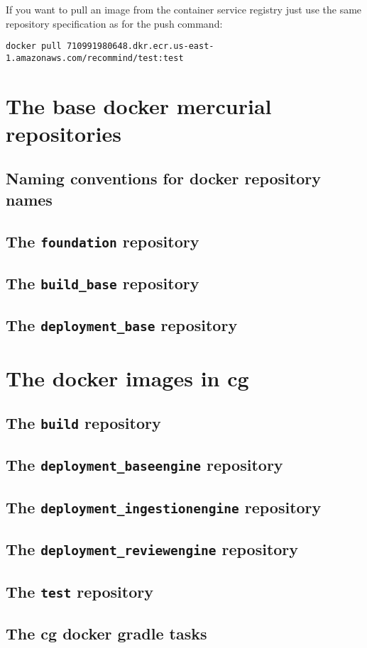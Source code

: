                    If you want to pull an image from the \aws{} container service registry just use the same repository specification as for the push command:
                   \begin{center}
                   		\texttt{docker pull 710991980648.dkr.ecr.us-east-1.amazonaws.com/recommind/test:test}
                 	\end{center}
	\section{The base docker mercurial repositories}\label{p01:ch05:docker_base_repos}
		\subsection{Naming conventions for docker repository names}
		\subsection{The \texttt{foundation} repository}
		\subsection{The \texttt{build\_base} repository}
		\subsection{The \texttt{deployment\_base} repository}
	\section{The docker images in cg}
		\subsection{The \texttt{build} repository}
		\subsection{The \texttt{deployment\_baseengine} repository}
		\subsection{The \texttt{deployment\_ingestionengine} repository}
		\subsection{The \texttt{deployment\_reviewengine} repository}
		\subsection{The \texttt{test} repository}
		\subsection{The cg docker gradle tasks}